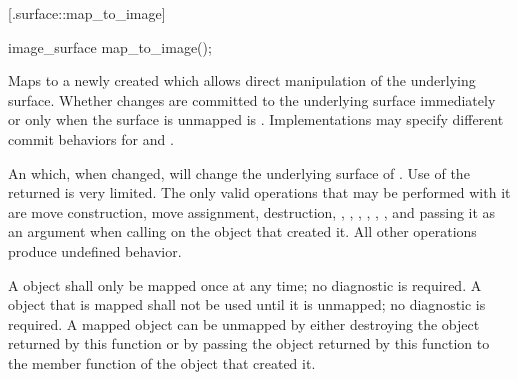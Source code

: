  [\iotwod.surface::map_to_image] {}

%
%
\begin{itemdecl}
image_surface map_to_image();
\end{itemdecl}
\begin{itemdescr}
	\pnum
	\effects
	Maps  to a newly created  which allows direct manipulation of the underlying surface. Whether changes are committed to the underlying surface immediately or only when the surface is unmapped is . Implementations may specify different commit behaviors for  and .
	
	\pnum
	\returns
	An  which, when changed, will change the underlying surface of .
	\enternote
	Use of the returned  is very limited. The only valid operations that may be performed with it are move construction, move assignment, destruction, , , , , , , and passing it as an argument when calling  on the  object that created it. All other operations produce undefined behavior.
	\exitnote
	
	\pnum
	\remarks
	A  object shall only be mapped once at any time; no diagnostic is required. A  object that is mapped shall not be used until it is unmapped; no diagnostic is required. A mapped  object can be unmapped by either destroying the  object returned by this function or by passing the  object returned by this function to the  member function of the  object that created it.
\end{itemdescr}

